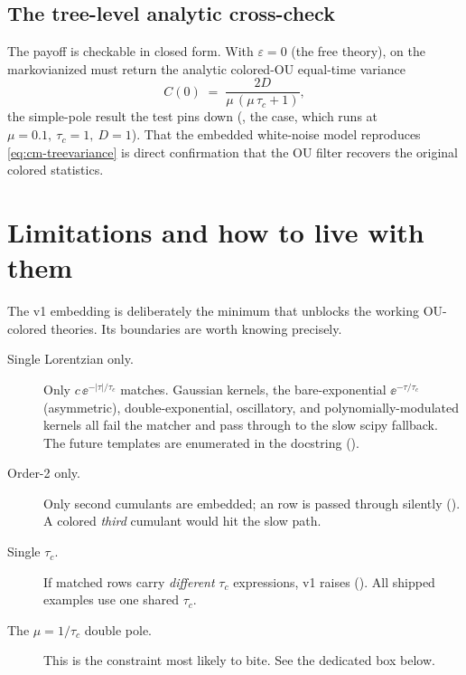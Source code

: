 \subsection{The tree-level analytic cross-check}

The payoff is checkable in closed form. With $\varepsilon = 0$ (the free theory),
 on the markovianized
 must return the analytic colored-OU equal-time
variance
\begin{equation}
  C(0) \;=\; \frac{2D}{\mu\,(\mu\,\tau_c + 1)},
  \label{eq:cm-treevariance}
\end{equation}
the simple-pole result the test pins down
(, the
 case, which runs at
$\mu = 0.1,\ \tau_c = 1,\ D = 1$). That the embedded white-noise model reproduces
\eqref{eq:cm-treevariance} is direct confirmation that the OU filter recovers the
original colored statistics.

\section{Limitations and how to live with them}

The v1 embedding is deliberately the minimum that unblocks the working
OU-colored theories. Its boundaries are worth knowing precisely.

\begin{description}
  \item[Single Lorentzian only.] Only $c\,\ee^{-|\tau|/\tau_c}$ matches. Gaussian
        kernels, the bare-exponential $\ee^{-\tau/\tau_c}$ (asymmetric),
        double-exponential, oscillatory, and polynomially-modulated kernels all
        fail the matcher and pass through to the slow scipy fallback. The future
        templates are enumerated in the docstring
        ().

  \item[Order-2 only.] Only second cumulants are embedded; an 
        row is passed through silently
        (). A colored
        \emph{third} cumulant would hit the slow path.

  \item[Single $\tau_c$.] If matched rows carry \emph{different} $\tau_c$
        expressions, v1 raises 
        (). All shipped examples
        use one shared $\tau_c$.

  \item[The \texorpdfstring{$\mu = 1/\tau_c$}{mu = 1/tauc} double pole.] This is
        the constraint most likely to bite. See the dedicated box below.
\end{description}

